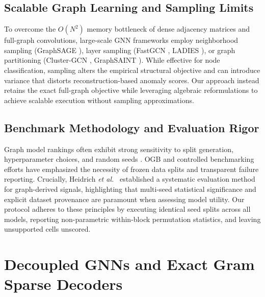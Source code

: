 \documentclass[11pt,a4paper]{article}
\newcommand{\etal}{\emph{et al.}}
\begin{document}
\subsection{Scalable Graph Learning and Sampling Limits}
To overcome the $O(N^2)$ memory bottleneck of dense adjacency matrices and full-graph convolutions, large-scale GNN frameworks employ neighborhood sampling (GraphSAGE \cite{hamilton2017graphsage}), layer sampling (FastGCN \cite{chen2018fastgcn}, LADIES \cite{zou2019ladies}), or graph partitioning (Cluster-GCN \cite{chiang2019clustergcn}, GraphSAINT \cite{zeng2020graphsaint}). While effective for node classification, sampling alters the empirical structural objective and can introduce variance that distorts reconstruction-based anomaly scores. Our approach instead retains the exact full-graph objective while leveraging algebraic reformulations to achieve scalable execution without sampling approximations.

\subsection{Benchmark Methodology and Evaluation Rigor}
Graph model rankings often exhibit strong sensitivity to split generation, hyperparameter choices, and random seeds \cite{shchur2018pitfalls,errica2020fair}. OGB \cite{hu2020ogb} and controlled benchmarking efforts \cite{dwivedi2023benchmarking} have emphasized the necessity of frozen data splits and transparent failure reporting. Crucially, Heidrich \etal\ \cite{heidrich2026systematic} established a systematic evaluation method for graph-derived signals, highlighting that multi-seed statistical significance and explicit dataset provenance are paramount when assessing model utility. Our protocol adheres to these principles by executing identical seed splits across all models, reporting non-parametric within-block permutation statistics, and leaving unsupported cells unscored.

\section{Decoupled GNNs and Exact Gram Sparse Decoders}
\label{sec:models}
\end{document}
